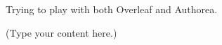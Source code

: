 \documentclass{article}
\begin{document}
Trying to play with both Overleaf and Authorea.

(Type your content here.)
\end{document}
